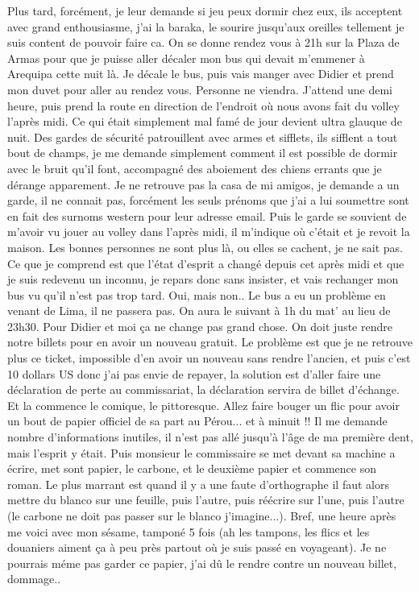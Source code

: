 \begin{multicols}{2}
Plus tard, forcément, je leur demande si jeu peux dormir chez eux, ils acceptent avec grand enthousiasme, j'ai la baraka, le sourire jusqu'aux oreilles tellement je suis content de pouvoir faire ca. On se donne rendez vous à 21h sur la Plaza de Armas pour que je puisse aller décaler mon bus qui devait m'emmener à Arequipa cette nuit là. Je décale le bus, puis vais manger avec Didier et prend mon duvet pour aller au rendez vous. Personne ne viendra. J'attend une demi heure, puis prend la route en direction de l'endroit où nous avons fait du volley l'après midi. Ce qui était simplement mal famé de jour devient ultra glauque de nuit. Des gardes de sécurité patrouillent avec armes et sifflets, ils sifflent a tout bout de champs, je me demande simplement comment il est possible de dormir avec le bruit qu'il font, accompagné des aboiement des chiens errants que je dérange apparement. Je ne retrouve pas la casa de mi amigos, je demande a un garde, il ne connait pas, forcément les seuls prénoms que j'ai a lui soumettre sont en fait des surnoms western pour leur adresse email. Puis le garde se souvient de m'avoir vu jouer au volley dans l'après midi, il m'indique où c'était et je revoit la maison. Les bonnes personnes ne sont plus là, ou elles se cachent, je ne sait pas. Ce que je comprend est que l'état d'esprit a changé depuis cet après midi et que je suis redevenu un inconnu, je repars donc sans insister, et vais rechanger mon bus vu qu'il n'est pas trop tard. Oui, mais non.. Le bus a eu un problème en venant de Lima, il ne passera pas. On aura le suivant à 1h du mat' au lieu de 23h30. Pour Didier et moi ça ne change pas grand chose. On doit juste rendre notre billets pour en avoir un nouveau gratuit. Le problème est que je ne retrouve plus ce ticket, impossible d'en avoir un nouveau sans rendre l'ancien, et puis c'est 10 dollars US donc j'ai pas envie de repayer, la solution est d'aller faire une déclaration de perte au commissariat, la déclaration servira de billet d'échange. Et la commence le comique, le pittoresque. Allez faire bouger un flic pour avoir un bout de papier officiel de sa part au Pérou... et à minuit !! Il me demande nombre d'informations inutiles, il n'est pas allé jusqu'à l'âge de ma première dent, mais l'esprit y était. Puis monsieur le commissaire se met devant sa machine a écrire, met sont papier, le carbone, et le deuxième papier et commence son roman. Le plus marrant est quand il y a une faute d'orthographe il faut alors mettre du blanco sur une feuille, puis l'autre, puis réécrire sur l'une, puis l'autre (le carbone ne doit pas passer sur le blanco j'imagine...). Bref, une heure après me voici avec mon sésame, tamponé 5 fois (ah les tampons, les flics et les douaniers aiment ça à peu près partout où je suis passé en voyageant). Je ne pourrais méme pas garder ce papier, j'ai dû le rendre contre un nouveau billet, dommage..


\end{multicols}
